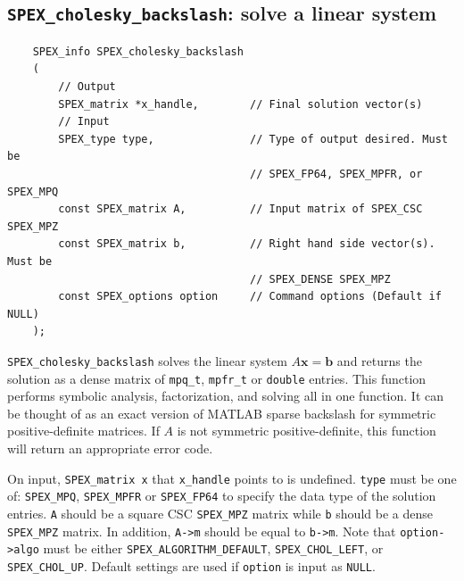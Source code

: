 \documentclass[12pt,oneside]{book}
\theoremstyle{definition}
\renewcommand{\b}{\mathbf{b}}
\newcommand{\x}{\mathbf{x}}
\begin{document}
\subsection{\texttt{SPEX\_cholesky\_backslash}: solve a linear system}
\label{ss:SPEX_Chol_backslash}
\begin{mdframed}[userdefinedwidth=\textwidth]
{\footnotesize
\begin{verbatim}
    SPEX_info SPEX_cholesky_backslash
    (
        // Output
        SPEX_matrix *x_handle,        // Final solution vector(s)
        // Input
        SPEX_type type,               // Type of output desired. Must be
                                      // SPEX_FP64, SPEX_MPFR, or SPEX_MPQ
        const SPEX_matrix A,          // Input matrix of SPEX_CSC SPEX_MPZ
        const SPEX_matrix b,          // Right hand side vector(s). Must be
                                      // SPEX_DENSE SPEX_MPZ 
        const SPEX_options option     // Command options (Default if NULL)
    );
\end{verbatim}
} \end{mdframed}

\verb|SPEX_cholesky_backslash| solves the linear system $A \x=\b$ and returns the solution
as a dense matrix of \verb|mpq_t|, \verb|mpfr_t| or \verb|double| entries. This
function performs symbolic analysis, factorization, and solving all in one function. 
It can be thought of as an exact version of MATLAB sparse backslash for symmetric positive-definite matrices.
If $A$ is not symmetric positive-definite, this function will return an appropriate error code.

On input, \verb|SPEX_matrix x| that \verb|x_handle| points to is undefined. \verb|type| must be one of:
\verb|SPEX_MPQ|, \verb|SPEX_MPFR| or \verb|SPEX_FP64| to specify the data type
of the solution entries. \verb|A| should be a square CSC \verb|SPEX_MPZ| matrix
while \verb|b| should be a dense \verb|SPEX_MPZ| matrix. In addition, \verb|A->m|
should be equal to \verb|b->m|. Note that \verb|option->algo| must be either 
\verb|SPEX_ALGORITHM_DEFAULT|, \verb|SPEX_CHOL_LEFT|, or \verb|SPEX_CHOL_UP|.
Default settings are used if
\verb|option| is input as \verb|NULL|.
\end{document}
